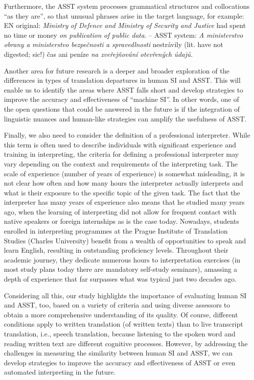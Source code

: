 \documentclass[output=paper]{langscibook}
\begin{document}
Furthermore, the ASST system processes grammatical structures and collocations “as they are”, so that unusual phrases arise in the target language, for example: EN original: \textit{Ministry of Defence and Ministry of Security and Justice} had spent no time or money \textit{on publication of public data}. – ASST system: \textit{A ministerstvo obrany a ministerstvo bezpečnosti a spravedlnosti} nestrávily (lit. have not digested; sic!) čas ani peníze \textit{na zveřejňování otevřených údajů.}

Another area for future research is a deeper and broader exploration of the differences in types of translation departures in human SI and ASST. This will enable us to identify the areas where ASST falls short and develop strategies to improve the accuracy and effectiveness of “machine SI”. In other words, one of the open questions that could be answered in the future is if the integration of linguistic nuances and human-like strategies can amplify the usefulness of ASST.

Finally, we also need to consider the definition of a professional interpreter. While this term is often used to describe individuals with significant experience and training in interpreting, the criteria for defining a professional interpreter may vary depending on the context and requirements of the interpreting task. The scale of experience (number of years of experience) is somewhat misleading, it is not clear how often and how many hours the interpreter actually interprets and what is their exposure to the specific topic of the given task. The fact that the interpreter has many years of experience also means that he studied many years ago, when the learning of interpreting did not allow for frequent contact with native speakers or foreign internships as is the case today. Nowadays, students enrolled in interpreting programmes at the Prague Institute of Translation Studies (Charles University) benefit from a wealth of opportunities to speak and learn English, resulting in outstanding proficiency levels. Throughout their academic journey, they dedicate numerous hours to interpretation exercises (in most study plans today there are mandatory self-study seminars), amassing a depth of experience that far surpasses what was typical just two decades ago.

Considering all this, our study highlights the importance of evaluating human SI and ASST, too, based on a variety of criteria and using diverse assessors to obtain a more comprehensive understanding of its quality. Of course, different conditions apply to written translation (of written texts) than to live transcript translation, i.e., speech translation, because listening to the spoken word and reading written text are different cognitive processes. However, by addressing the challenges in measuring the similarity between human SI and ASST, we can develop strategies to improve the accuracy and effectiveness of ASST or even automated interpreting in the future.
\end{document}
